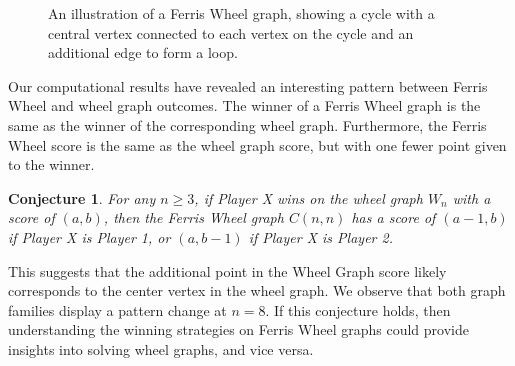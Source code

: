 \documentclass{article}
\newtheorem{conjecture}[theorem]{Conjecture}
\begin{document}
\begin{figure}[hbt!]
\centering
{}
\caption{An illustration of a Ferris Wheel graph, showing a cycle with a central vertex connected to each vertex on the cycle and an additional edge to form a loop.}
\label{fig:ferris-wheel-graph}
\end{figure}
\FloatBarrier

Our computational results have revealed an interesting pattern between Ferris Wheel and wheel graph outcomes. The winner of a Ferris Wheel graph is the same as the winner of the corresponding wheel graph. Furthermore, the Ferris Wheel score is the same as the wheel graph score, but with one fewer point given to the winner.

\begin{conjecture}
For any $n \geq 3$, if Player X wins on the wheel graph $W_n$ with a score of $(a, b)$, then the Ferris Wheel graph $C(n,n)$ has a score of $(a-1, b)$ if Player X is Player 1, or $(a, b-1)$ if Player X is Player 2.
\end{conjecture}


This suggests that the additional point in the Wheel Graph score likely corresponds to the center vertex in the wheel graph. We observe that both graph families display a pattern change at $n=8$. If this conjecture holds, then understanding the winning strategies on Ferris Wheel graphs could provide insights into solving wheel graphs, and vice versa.

\end{document}
